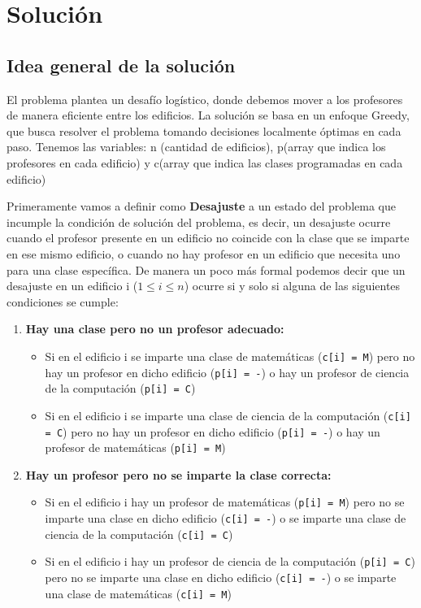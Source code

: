 \documentclass[11pt]{article}
\begin{document}
    \newpage

    \section{Solución}
    \subsection{Idea general de la solución}
    El problema plantea un desafío logístico, donde debemos mover a los profesores de manera eficiente entre 
    los edificios. La solución se basa en un enfoque Greedy, que busca resolver el problema tomando decisiones 
    localmente óptimas en cada paso. Tenemos las variables: n (cantidad de edificios), p(array que indica los
    profesores en cada edificio) y c(array que indica las clases programadas en cada edificio)

    Primeramente vamos a definir como \textbf{Desajuste} a un estado del problema que incumple la condición
    de solución del problema, es decir, un desajuste ocurre cuando el profesor presente en un edificio no 
    coincide con la clase que se imparte en ese mismo edificio, o cuando no hay profesor en un edificio que 
    necesita uno para una clase específica. De manera un poco más formal podemos decir que un desajuste en un
    edificio i ($1 \leq i \leq n$) ocurre si y solo si alguna de las siguientes condiciones se cumple:

    \begin{enumerate}
        \item \textbf{Hay una clase pero no un profesor adecuado:}
        \begin{itemize}
            \item Si en el edificio i se imparte una clase de matemáticas (\texttt{c[i] = M}) pero no hay
                  un profesor en dicho edificio (\texttt{p[i] = -}) o hay un profesor de ciencia de la 
                  computación (\texttt{p[i] = C})
            \item Si en el edificio i se imparte una clase de ciencia de la computación (\texttt{c[i] = C})
                  pero no hay un profesor en dicho edificio (\texttt{p[i] = -}) o hay un profesor de matemáticas 
                  (\texttt{p[i] = M})
        \end{itemize}

        \item \textbf{Hay un profesor pero no se imparte la clase correcta:}
        \begin{itemize}
            \item Si en el edificio i hay un profesor de matemáticas (\texttt{p[i] = M}) pero no se
                  imparte una clase en dicho edificio (\texttt{c[i] = -}) o se imparte una clase de 
                  ciencia de la computación (\texttt{c[i] = C})
            \item Si en el edificio i hay un profesor de ciencia de la computación (\texttt{p[i] = C})
                  pero no se imparte una clase en dicho edificio (\texttt{c[i] = -}) o se imparte una 
                  clase de matemáticas (\texttt{c[i] = M})
        \end{itemize}
    \end{enumerate}
\end{document}
